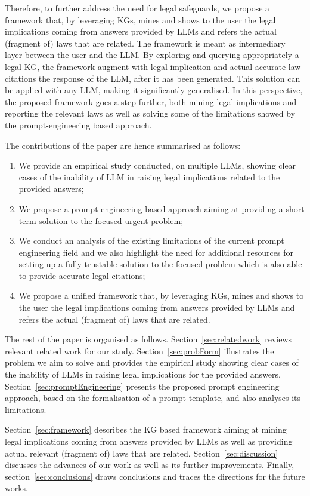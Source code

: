 \documentclass[sn-mathphys-num]{sn-jnl}%
\begin{document}
Therefore, to further address the need for legal safeguards, we propose a framework that, by leveraging KGs, mines and shows to the user the legal implications coming from answers provided by LLMs and  refers the actual (fragment of) laws that are related. 
The framework is meant as intermediary layer between the user and the LLM. By exploring and querying appropriately a legal KG, the framework augment with legal implication and actual accurate law citations the response of the LLM, after it has been generated. This solution can be applied with any LLM, making it significantly generalised. In this perspective, the proposed framework goes a step further, both mining legal implications and reporting the relevant laws as well as solving some of the limitations showed by the prompt-engineering based approach.

The contributions of the paper are hence summarised as follows:
\begin{enumerate}
    \item We provide an empirical study conducted, on  multiple LLMs, showing clear cases of the inability of LLM in raising legal implications related to the provided answers;
    \item We propose a prompt engineering based approach aiming at providing a short term solution to the focused urgent problem;
    \item We conduct an analysis of the existing limitations of the current prompt engineering field and we also highlight the need for additional resources for setting up a fully trustable solution to the focused problem which is also able to provide accurate legal citations;
    \item We propose a unified framework that, by leveraging KGs, mines and shows to the user the legal implications coming from answers provided by LLMs and  refers the actual (fragment of) laws that are related.
\end{enumerate}

The rest of the paper is organised as follows. Section~\ref{sec:relatedwork} reviews relevant related work for our study. Section~\ref{sec:probForm} 
illustrates the problem we aim to solve 
and provides the empirical study showing clear cases of the inability of LLMs in raising legal implications for the provided answers.  Section~\ref{sec:promptEngineering} presents the proposed prompt engineering approach, based on the formalisation of a prompt template, and also analyses its limitations.  

Section~\ref{sec:framework} 
describes the KG based framework aiming at mining legal implications coming from answers provided by LLMs as well as providing actual relevant (fragment of) laws that are related. Section~\ref{sec:discussion} discusses the advances of our work as well as its further improvements. Finally, section~\ref{sec:conclusions} 
draws conclusions and traces the directions for the future works.
\end{document}

